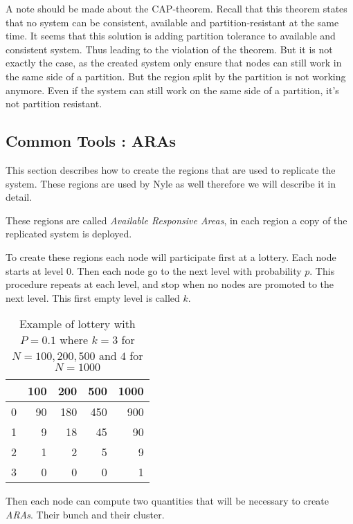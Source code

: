 \documentclass[a4paper,11pt,oneside]{report}
\begin{document}
A note should be made about the CAP-theorem. Recall that this theorem states
that no system can be consistent, available and partition-resistant at the same
time. It seems that this solution is adding partition tolerance to available
and consistent system. Thus leading to the violation of the theorem. But it is
not exactly the case, as the created system only ensure that nodes can still
work in the same side of a partition. But the region split by the partition is
not working anymore. Even if the system can still work on the same side of a
partition, it's not partition resistant.

\subsection{Common Tools :  ARAs} This section describes how to create the
regions that are used to replicate the system. These regions are used by Nyle
as well therefore we will describe it in detail. 

These regions are called \textit{Available Responsive Areas}, in each region a
copy of the replicated system is deployed. 

To create these regions each node will participate first at a lottery. Each
node starts at level 0. Then each node go to the next level with probability
$p$. This procedure repeats at each level, and stop when no nodes are promoted
to the next level. This first empty level is called $k$. 

\begin{table}[] \begin{tabular}{rrrrr} & 100 & 200 & 500 & 1000 \\ \hline
    \multicolumn{1}{r|}{0} & 90  & 180 & 450 & 900  \\ \multicolumn{1}{r|}{1} &
    9   & 18  & 45  & 90   \\ \multicolumn{1}{r|}{2} & 1   & 2   & 5   & 9
    \\ \multicolumn{1}{r|}{3} & 0   & 0   & 0   & 1   \end{tabular}
    \caption{Example of lottery with $P = 0.1$ where $k= 3$ for $N=
    100,200,500$ and $4$ for $N = 1000$} \end{table}

Then each node can compute two quantities that will be necessary to create
\textit{ARAs}. Their bunch and their cluster. 
\end{document}
